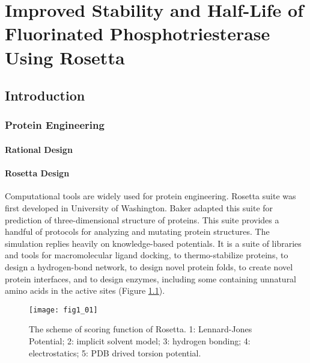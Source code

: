 \chapter{Improved Stability and Half-Life of Fluorinated Phosphotriesterase
Using Rosetta} 
\label{chap:rosetta}

\begin{refsection}

\section{Introduction}

\subsection{Protein Engineering}
\label{sec:protein-engineering}

\subsubsection{Rational Design}

\subsubsection{Rosetta Design}

Computational tools are widely used for protein
engineering\cite{Rothlisberger2008,DiMaio2011a,Korkegian2005,
Leaver-Fay2013a,Leaver-Fay2011,Drew2013a,Kaufmann2010,Rohl2004}.
Rosetta suite was first developed in University of Washington. Baker  adapted this suite for prediction of three-dimensional structure of
proteins\cite{Leaver-Fay2011}. This suite provides a handful of protocols for
analyzing and mutating protein structures.  The simulation replies heavily on
knowledge-based potentials. It is a suite of libraries and tools for
macromolecular ligand docking, to thermo-stabilize proteins, to design a
hydrogen-bond network, to design novel protein folds, to create novel protein
interfaces, and to design enzymes, including some containing unnatural amino
acids in the active sites (Figure \ref{fig:rosetta-intro}).
\begin{figure}[h!] \centering \texttt{[image: fig1\_01]}
    \caption[The scheme of scoring function of Rosetta. 1: Lennard-Jones
    Potential; 2: implicit solvent model; 3: hydrogen bonding; 4:
electrostatics; 5: PDB drived torsion potential.]{The scheme of scoring
    function of Rosetta. 1: Lennard-Jones Potential; 2: implicit solvent model;
3: hydrogen bonding; 4: electrostatics; 5: PDB drived torsion potential.}
\label{fig:rosetta-intro}


\end{figure}
\end{refsection}
